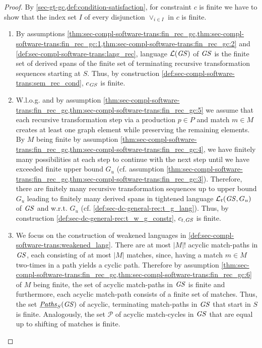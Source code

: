 \begin{proof}
By \cref{sec-gt-gc,def:condition-satisfaction}, for constraint $c$ is finite we have to show that the index set $I$ of every disjunction $\vee_{i \in I}$ in $c$ is finite.
\begin{enumerate}
  \item By assumptions \cref{thm:sec-compl-software-trans:fin_rec_gc,thm:sec-compl-software-trans:fin_rec_gc:1,thm:sec-compl-software-trans:fin_rec_gc:2} and \cref{def:sec-compl-software-trans:lang_rec}, language $\mathcal{L}(\mathit{GS})$ of $\mathit{GS}$ is the finite set of derived spans of the finite set of terminating recursive transformation sequences starting at $S$.
  Thus, by construction \cref{def:sec-compl-software-trans:sem_rec_cond}, $c_\mathit{GS}$ is finite.
  \item W.l.o.g. and by assumption \cref{thm:sec-compl-software-trans:fin_rec_gc,thm:sec-compl-software-trans:fin_rec_gc:5} we assume that each recursive transformation step via a production $p \in P$ and match $m \in M$ creates at least one graph element while preserving the remaining elements.
  By $M$ being finite by assumption \cref{thm:sec-compl-software-trans:fin_rec_gc,thm:sec-compl-software-trans:fin_rec_gc:4}, we have finitely many possibilities at each step to continue with the next step until we have exceeded finite upper bound $G_u$ (cf. assumption \cref{thm:sec-compl-software-trans:fin_rec_gc,thm:sec-compl-software-trans:fin_rec_gc:3}).
  Therefore, there are finitely many recursive transformation sequences up to upper bound $G_u$ leading to finitely many derived spans in tightened language $\mathcal{L}_t(\mathit{GS},G_u)$ of $\mathit{GS}$ and w.r.t. $G_u$ (cf. \cref{def:sec-dc-general-rec:t_g_lang}).
  Thus, by construction \cref{def:sec-dc-general-rec:t_w_g_constr}, $c_{t,\mathit{GS}}$ is finite.
  \item We focus on the construction of weakened languages in \cref{def:sec-compl-software-trans:weakened_lang}.
  There are at most $|M|!$ acyclic match-paths in $\mathit{GS}$, each consisting of at most $|M|$ matches, since, having a match $m \in M$ two-times in a path yields a cyclic path.
  Therefore by assumption \cref{thm:sec-compl-software-trans:fin_rec_gc,thm:sec-compl-software-trans:fin_rec_gc:6} of $M$ being finite, the set of acyclic match-paths in $\mathit{GS}$ is finite and furthermore, each acyclic match-path consists of a finite set of matches.
  Thus, the set $\underline{\mathit{Paths}}_S(\mathit{GS})$ of acyclic, terminating match-paths in $\mathit{GS}$ that start in $S$ is finite.
  Analogously, the set $\mathcal{P}$ of acyclic match-cycles in $\mathit{GS}$ that are equal up to shifting of matches is finite.

\end{enumerate}
\end{proof}
